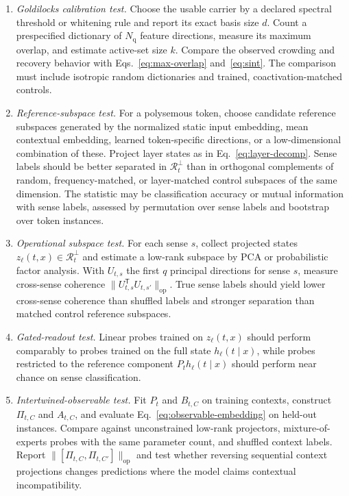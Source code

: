 \documentclass[
  aps,
  reprint,
  superscriptaddress,
  floatfix,
  nofootinbib,
  longbibliography
]{revtex4-2}
\newcommand{\Nq}{N_{\mathrm q}}
\newcommand{\T}{^{\mathsf{T}}}
\newcommand{\opnorm}[1]{\lVert #1 \rVert_{\mathrm{op}}}
\begin{document}
\begin{enumerate}
\item \emph{Goldilocks calibration test.}
Choose the usable carrier by a declared spectral threshold or whitening rule
and report its exact basis size $d$. Count a prespecified dictionary of $\Nq$
feature directions, measure its maximum overlap, and estimate active-set size
$k$. Compare the observed crowding and recovery behavior with
Eqs.~\eqref{eq:max-overlap} and~\eqref{eq:sint}. The comparison must include
isotropic random dictionaries and trained, coactivation-matched controls.

\item \emph{Reference-subspace test.}
For a polysemous token, choose candidate reference subspaces generated
by the normalized static input embedding, mean contextual embedding,
learned token-specific directions, or a low-dimensional combination of
these. Project layer states as in Eq.~\eqref{eq:layer-decomp}. Sense labels
should be better separated in $\mathcal R_t^\perp$ than in orthogonal
complements of random, frequency-matched, or layer-matched control
subspaces of the same dimension. The statistic may be classification accuracy or
mutual information with sense labels, assessed by permutation over
sense labels and bootstrap over token instances.

\item \emph{Operational subspace test.}
For each sense $s$, collect projected states
$z_\ell(t,x)\in\mathcal R_t^\perp$ and estimate a low-rank subspace by PCA or
probabilistic factor analysis. With $U_{t,s}$ the first $q$ principal
directions for sense $s$, measure cross-sense coherence
$\opnorm{U_{t,s}\T U_{t,s'}}$. True sense labels should yield lower
cross-sense coherence than shuffled labels and stronger separation than
matched control reference subspaces.

\item \emph{Gated-readout test.}
Linear probes trained on $z_\ell(t,x)$ should perform comparably to
probes trained on the full state $h_\ell(t\mid x)$, while probes
restricted to the reference component $P_t h_\ell(t\mid x)$ should perform
near chance on sense classification.

\item \emph{Intertwined-observable test.}
Fit $P_t$ and $B_{t,C}$ on training contexts, construct $\Pi_{t,C}$ and
$A_{t,C}$, and evaluate Eq.~\eqref{eq:observable-embedding} on held-out
instances. Compare against unconstrained low-rank projectors, mixture-of-
experts probes with the same parameter count, and shuffled context labels.
Report $\opnorm{[\Pi_{t,C},\Pi_{t,C'}]}$ and test whether reversing sequential
context projections changes predictions where the model claims contextual
incompatibility.


\end{enumerate}
\end{document}
